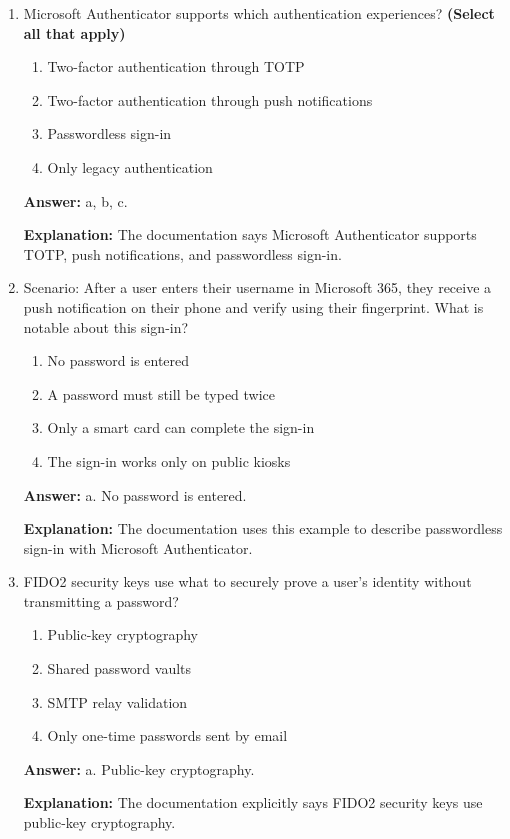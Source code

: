 \documentclass[10pt]{article}
\begin{document}
\begin{enumerate}[leftmargin=*]
\item Microsoft Authenticator supports which authentication experiences? \textbf{(Select all that apply)}
\begin{enumerate}[label=\alph*., leftmargin=1.5em]
\item Two-factor authentication through TOTP
\item Two-factor authentication through push notifications
\item Passwordless sign-in
\item Only legacy authentication
\end{enumerate}
\textbf{Answer:} a, b, c.

\textbf{Explanation:} The documentation says Microsoft Authenticator supports TOTP, push notifications, and passwordless sign-in.

\item Scenario: After a user enters their username in Microsoft 365, they receive a push notification on their phone and verify using their fingerprint. What is notable about this sign-in?
\begin{enumerate}[label=\alph*., leftmargin=1.5em]
\item No password is entered
\item A password must still be typed twice
\item Only a smart card can complete the sign-in
\item The sign-in works only on public kiosks
\end{enumerate}
\textbf{Answer:} a. No password is entered.

\textbf{Explanation:} The documentation uses this example to describe passwordless sign-in with Microsoft Authenticator.

\item FIDO2 security keys use what to securely prove a user's identity without transmitting a password?
\begin{enumerate}[label=\alph*., leftmargin=1.5em]
\item Public-key cryptography
\item Shared password vaults
\item SMTP relay validation
\item Only one-time passwords sent by email
\end{enumerate}
\textbf{Answer:} a. Public-key cryptography.

\textbf{Explanation:} The documentation explicitly says FIDO2 security keys use public-key cryptography.


\end{enumerate}
\end{document}
